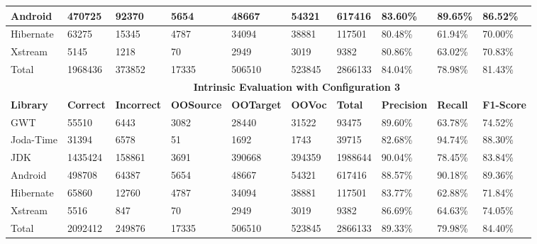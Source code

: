\begin{table}[t]
\begin{tabular}{|l|l|l|l|l|l|l|l|l|l|}
\hline
Android   & 470725                                    & 92370     & 5654     & 48667    & 54321  & 617416  & 83.60\%   & 89.65\% & 86.52\%  \\
\hline
Hibernate & 63275                                     & 15345     & 4787     & 34094    & 38881  & 117501  & 80.48\%   & 61.94\% & 70.00\%  \\
\hline
Xstream   & 5145                                      & 1218      & 70       & 2949     & 3019   & 9382    & 80.86\%   & 63.02\% & 70.83\%  \\
\hline
Total     & 1968436                                   & 373852    & 17335    & 506510   & 523845 & 2866133 & 84.04\%   & 78.98\% & 81.43\%  \\
\hline
          & \multicolumn{9}{c|}{\textbf{Intrinsic Evaluation with Configuration 3}}        \\
\hline
\textbf{Library}   & \textbf{Correct} & \textbf{Incorrect} & \textbf{OOSource} & \textbf{OOTarget} & \textbf{OOVoc}  & \textbf{Total}   & \textbf{Precision} & \textbf{Recall}  & \textbf{F1-Score} \\ \hline
GWT       & 55510                                     & 6443      & 3082     & 28440    & 31522  & 93475   & 89.60\%   & 63.78\% & 74.52\%  \\
\hline
Joda-Time & 31394                                     & 6578      & 51       & 1692     & 1743   & 39715   & 82.68\%   & 94.74\% & 88.30\%  \\
\hline
JDK       & 1435424                                   & 158861    & 3691     & 390668   & 394359 & 1988644 & 90.04\%   & 78.45\% & 83.84\%  \\
\hline
Android   & 498708                                    & 64387     & 5654     & 48667    & 54321  & 617416  & 88.57\%   & 90.18\% & 89.36\%  \\
\hline
Hibernate & 65860                                     & 12760     & 4787     & 34094    & 38881  & 117501  & 83.77\%   & 62.88\% & 71.84\%  \\
\hline
Xstream   & 5516                                      & 847       & 70       & 2949     & 3019   & 9382    & 86.69\%   & 64.63\% & 74.05\%  \\
\hline
Total     & 2092412                                   & 249876    & 17335    & 506510   & 523845 & 2866133 & 89.33\%   & 79.98\% & 84.40\%  \\
\hline
\end{tabular}

\label{tbl:Intrinsic}
\end{table}

